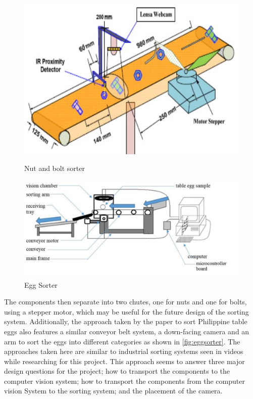 \begin{figure}[H]
  \hfill
  \begin{minipage}[t]{0.45\textwidth}
    \centering
    \includegraphics[width=\textwidth]{imgs/articles/conveyor.jpg}
    \caption{Nut and bolt sorter \cite{Dhenge2013MechanicalNS}}
    \label{fig:conveyor}
  \end{minipage}
  \hfill
  \begin{minipage}[t]{0.45\textwidth}
    \centering
    \includegraphics[width=\textwidth]{imgs/articles/eggsorter.jpg}
    \caption{Egg Sorter \cite{eggsorting}}
    \label{fig:eggsorter}
  \end{minipage}
  \hfill
\end{figure}

The components then separate into two chutes, one for nuts and one for bolts, using a stepper motor, which may be useful for the future design of the sorting system. Additionally, the approach taken by the paper \citet{eggsorting} to sort Philippine table eggs also features a similar conveyor belt system, a down-facing camera and an arm to sort the eggs into different categories as shown in \autoref{fig:eggsorter}. The approaches taken here are similar to industrial sorting systems seen in videos while researching for this project. This approach seems to answer three major design questions for the project; how to transport the components to the computer vision system; how to transport the components from the computer vision System to the sorting system; and the placement of the camera.


